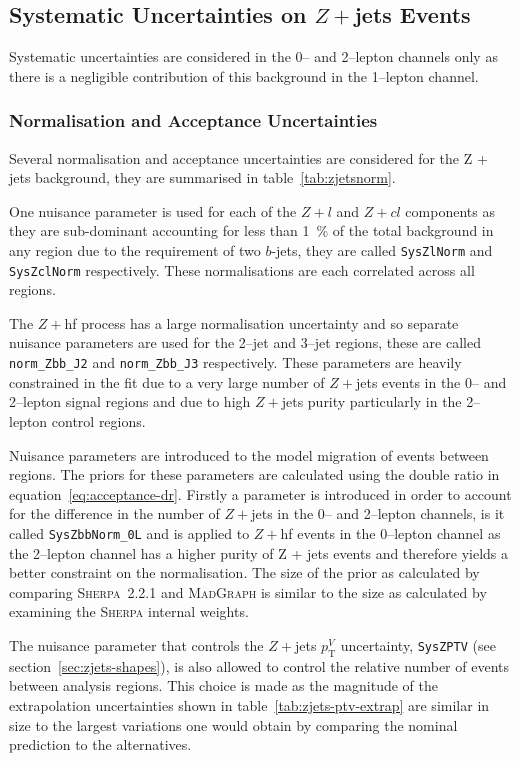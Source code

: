 \subsection{Systematic Uncertainties on $Z+$jets Events}
\label{sec:zjets-systs}

Systematic uncertainties are considered in the 0-- and 2--lepton channels only
as there is a negligible contribution of this background in the 1--lepton channel.

\subsubsection{Normalisation and Acceptance Uncertainties}

Several normalisation and acceptance uncertainties are considered for the Z +
jets background, they are summarised in table~\ref{tab:zjetsnorm}.

One nuisance parameter is used for each of the $Z+l$ and $Z+cl$ components as
they are sub-dominant accounting for less than 1~\% of the total background in
any region due to the requirement of two $b$-jets, they are called
\texttt{SysZlNorm} and \texttt{SysZclNorm} respectively. These normalisations
are each correlated across all regions.

The $Z+$hf process has a large normalisation uncertainty and so separate
nuisance parameters are used for the 2--jet and 3--jet regions, these are called
\texttt{norm\_Zbb\_J2} and \texttt{norm\_Zbb\_J3} respectively. These parameters
are heavily constrained in the fit due to a very large number of $Z+$jets events
in the 0-- and 2--lepton signal regions and due to high $Z+$jets purity
particularly in the 2--lepton control regions.

Nuisance parameters are introduced to the model migration of events between
regions. The priors for these parameters are calculated using the double ratio
in equation~\ref{eq:acceptance-dr}. Firstly a parameter is introduced in order
to account for the difference in the number of $Z+$jets in the 0-- and 2--lepton
channels, is it called \texttt{SysZbbNorm\_0L} and is applied to $Z+$hf events
in the 0--lepton channel as the 2--lepton channel has a higher purity of Z +
jets events and therefore yields a better constraint on the normalisation. The
size of the prior as calculated by comparing \textsc{Sherpa}~2.2.1 and
\textsc{MadGraph} is similar to the size as calculated by examining the
\textsc{Sherpa} internal weights.

The nuisance parameter that controls the $Z+$jets $p_{\mathrm{T}}^V$
uncertainty, \texttt{SysZPTV} (see section~\ref{sec:zjets-shapes}), is also
allowed to control the relative number of events between analysis regions. This
choice is made as the magnitude of the extrapolation uncertainties shown in
table~\ref{tab:zjets-ptv-extrap} are similar in size to the largest variations
one would obtain by comparing the nominal prediction to the
alternatives.

